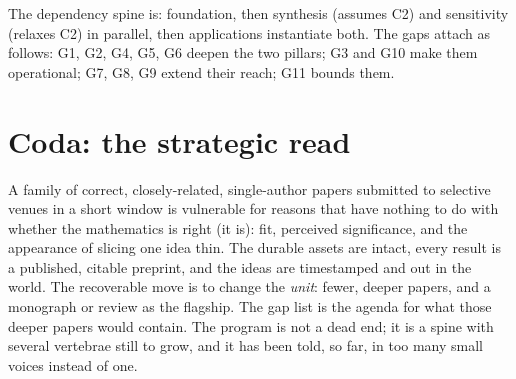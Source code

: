 \documentclass[11pt]{article}
\begin{document}
The dependency spine is: foundation, then synthesis (assumes C2) and sensitivity
(relaxes C2) in parallel, then applications instantiate both. The gaps attach as
follows: G1, G2, G4, G5, G6 deepen the two pillars; G3 and G10 make them operational;
G7, G8, G9 extend their reach; G11 bounds them.

\section{Coda: the strategic read}

A family of correct, closely-related, single-author papers submitted to selective
venues in a short window is vulnerable for reasons that have nothing to do with
whether the mathematics is right (it is): fit, perceived significance, and the
appearance of slicing one idea thin. The durable assets are intact, every result is
a published, citable preprint, and the ideas are timestamped and out in the world.
The recoverable move is to change the \emph{unit}: fewer, deeper papers, and a
monograph or review as the flagship. The gap list is the agenda for what those deeper
papers would contain. The program is not a dead end; it is a spine with several
vertebrae still to grow, and it has been told, so far, in too many small voices
instead of one.



\end{document}

